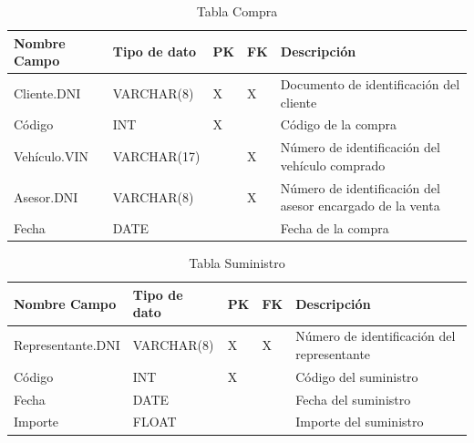 \documentclass[12pt]{article}
\begin{document}
\begin{table}[htbp]
    \begin{center}
        \begin{tabular}{|p{3cm}|p{3cm}|p{1cm}|p{1cm}|p{6cm}|}
            \hline
            Nombre Campo & Tipo de dato & PK & FK & Descripción \\
            \hline
            Cliente.DNI & VARCHAR(8) & X & X & Documento de identificación del cliente\\
            Código & INT & X &  & Código de la compra \\
            Vehículo.VIN & VARCHAR(17) &  & X & Número de identificación del vehículo comprado \\
            Asesor.DNI & VARCHAR(8) &  & X & Número de identificación del asesor encargado de la venta \\
            Fecha & DATE &  &  & Fecha de la compra \\
            \hline
        \end{tabular}
        \caption{Tabla Compra}
            \end{center}
\end{table}


\begin{table}[htbp]
    \begin{center}
        \begin{tabular}{|p{3cm}|p{3cm}|p{1cm}|p{1cm}|p{6cm}|}
            \hline
            Nombre Campo & Tipo de dato & PK & FK & Descripción \\
            \hline
            Representante.DNI & VARCHAR(8) & X & X & Número de identificación del representante \\
            Código & INT & X &  & Código del suministro \\
            Fecha & DATE &  &  & Fecha del suministro \\
            Importe & FLOAT &  &  & Importe del suministro \\
            \hline
            \end{tabular}
        \caption{Tabla Suministro}
            \end{center}
\end{table}
\end{document}
